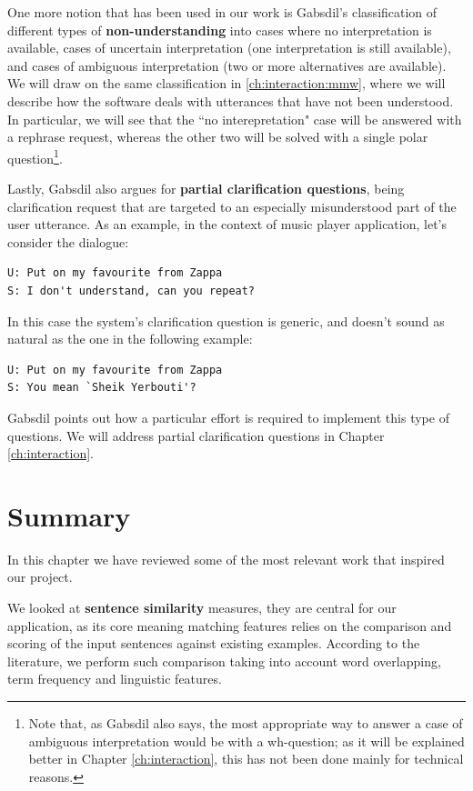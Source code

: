 One more notion that has been used in our work is Gabsdil's classification of different types of \textbf{non-understanding} into cases where no interpretation is available, cases of uncertain interpretation (one interpretation is still available), and cases of ambiguous interpretation (two or more alternatives are available). We will draw on the same classification in \ref{ch:interaction:mmw}, where we will describe how the software deals with utterances that have not been understood. In particular, we will see that the ``no interepretation" case will be answered with a rephrase request, whereas the other two will be solved with a single polar question\footnote{Note that, as Gabsdil also says, the most appropriate way to answer a case of ambiguous interpretation would be with a wh-question; as it will be explained better in Chapter \ref{ch:interaction}, this has not been done mainly for technical reasons.}.

Lastly, Gabsdil also argues for \textbf{partial clarification questions}, being clarification request that are targeted to an especially misunderstood part of the user utterance. As an example, in the context of music player application, let's consider the dialogue:
\begin{verbatim}
U: Put on my favourite from Zappa
S: I don't understand, can you repeat?
\end{verbatim}
In this case the system's clarification question is generic, and doesn't sound as natural as the one in the following example:
\begin{verbatim}
U: Put on my favourite from Zappa
S: You mean `Sheik Yerbouti'?
\end{verbatim}
Gabsdil points out how a particular effort is required to implement this type of questions. We will address partial clarification questions in Chapter \ref{ch:interaction}.

\section{Summary}
In this chapter we have reviewed some of the most relevant work that inspired our project.

We looked at \textbf{sentence similarity} measures, they are central for our application, as its core meaning matching features relies on the comparison and scoring of the input sentences against existing examples. According to the literature, we perform such comparison taking into account word overlapping, term frequency and linguistic features.

